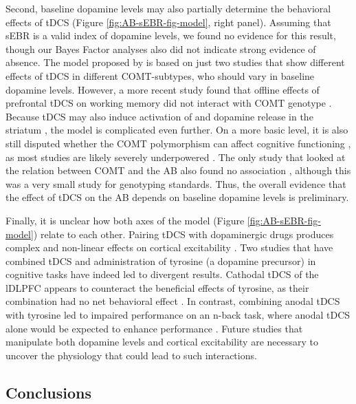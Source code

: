 \documentclass[11pt,]{memoir}
\begin{document}
Second, baseline dopamine levels may also partially determine the behavioral effects of tDCS \autocite{Wiegand2016} (Figure \ref{fig:AB-sEBR-fig-model}, right panel). Assuming that sEBR is a valid index of dopamine levels, we found no evidence for this result, though our Bayes Factor analyses also did not indicate strong evidence of absence. The model proposed by \textcite{Wiegand2016} is based on just two studies \autocites{Plewnia2013}{Nieratschker2015} that show different effects of tDCS in different COMT-subtypes, who should vary in baseline dopamine levels. However, a more recent study found that offline effects of prefrontal tDCS on working memory did not interact with COMT genotype \autocite{Jongkees2018}. Because tDCS may also induce activation of \autocite{Meyer2019} and dopamine release in the striatum \autocites{Tanaka2013}{Fonteneau2018}, the model is complicated even further. On a more basic level, it is also still disputed whether the COMT polymorphism can affect cognitive functioning \autocite{Barnett2008}, as most studies are likely severely underpowered \autocite{Border2019}. The only study that looked at the relation between COMT and the AB also found no association \autocite{Colzato2011}, although this was a very small study for genotyping standards. Thus, the overall evidence that the effect of tDCS on the AB depends on baseline dopamine levels is preliminary.

Finally, it is unclear how both axes of the model (Figure \ref{fig:AB-sEBR-fig-model}) relate to each other. Pairing tDCS with dopaminergic drugs produces complex and non-linear effects on cortical excitability \autocites{Monte-Silva2009}{Fresnoza2014}. Two studies that have combined tDCS and administration of tyrosine (a dopamine precursor) in cognitive tasks have indeed led to divergent results. Cathodal tDCS of the lDLPFC appears to counteract the beneficial effects of tyrosine, as their combination had no net behavioral effect \autocites{Jongkees2017}{Dennison2018}. In contrast, combining anodal tDCS with tyrosine led to impaired performance on an n-back task, where anodal tDCS alone would be expected to enhance performance \autocite{Jongkees2017}. Future studies that manipulate both dopamine levels and cortical excitability are necessary to uncover the physiology that could lead to such interactions.

\hypertarget{conclusions}{%
\subsection{Conclusions}\label{conclusions}}
\end{document}
